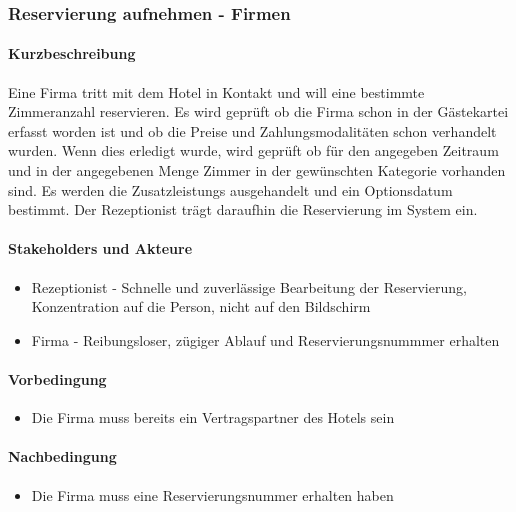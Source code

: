 \subsubsection{Reservierung aufnehmen - Firmen}
\label{UseCase_ReservierungAufnehmenFirmen}

\paragraph{Kurzbeschreibung}  
Eine Firma tritt mit dem Hotel in Kontakt und will eine bestimmte
\Gls{Zimmer}anzahl reservieren. Es wird geprüft ob die Firma schon in der
Gästekartei erfasst worden ist und ob die Preise und Zahlungsmodalitäten schon verhandelt wurden. Wenn dies erledigt wurde, wird geprüft ob für den angegeben Zeitraum und in der angegebenen Menge \Gls{Zimmer} in der gewünschten Kategorie vorhanden sind. Es werden die \Glspl{Zusatzleistung} ausgehandelt und ein \Gls{Optionsdatum} bestimmt. Der \Gls{Rezeptionist} trägt daraufhin die \Gls{Reservierung} im System ein.

\paragraph{Stakeholders und Akteure}
\begin{itemize}
	\item \Gls{Rezeptionist} - Schnelle und zuverlässige Bearbeitung der \Gls{Reservierung}, Konzentration auf die Person, nicht auf den Bildschirm
	\item Firma - Reibungsloser, zügiger Ablauf und Reservierungsnummmer erhalten
\end{itemize}

\paragraph{Vorbedingung}
\begin{itemize}
	\item Die Firma muss bereits ein Vertragspartner des Hotels sein
\end{itemize}

\paragraph{Nachbedingung}
\begin{itemize}
	\item Die Firma muss eine \Gls{Reservierungsnummer} erhalten haben
\end{itemize}

